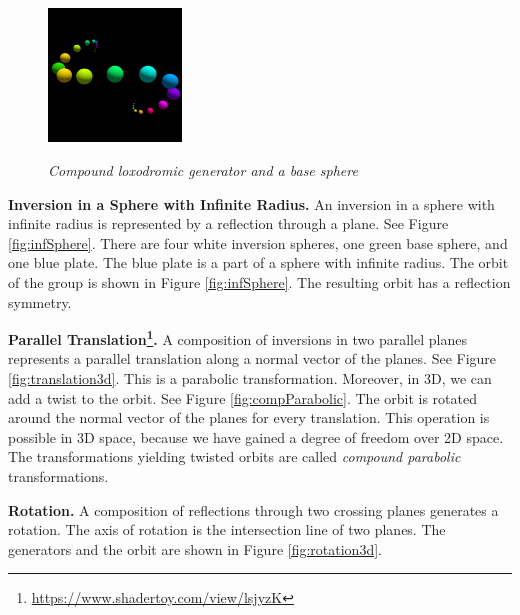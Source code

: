 \begin{figure}[h!tbp]
\begin{minipage}[t]{0.5\hsize}
 \hspace*{\fill}
  \begin{minipage}[t]{0.25\hsize}
   \center
   \includegraphics[width=1.4in, height=1.4in, keepaspectratio]{./img/application/3dGen/compLoxoOneOrb.pdf}
   \label{fig:compLoxoOrb}
  \end{minipage}
  \hspace*{\fill}
  \caption{\textit{Compound loxodromic generator and a base sphere}}
  \label{fig:compLoxo}
 \end{minipage}
\end{figure}

\noindent\textbf{Inversion in a Sphere with Infinite Radius.}
An inversion in a sphere with infinite radius is represented by
a reflection through a plane.
See Figure \ref{fig:infSphere}.
There are four white inversion spheres, one green base sphere,
and one blue plate.
The blue plate is a part of a sphere with infinite radius.
The orbit of the group is shown in Figure
\ref{fig:infSphere}.
The resulting orbit has a reflection symmetry.

\noindent\textbf{Parallel
Translation\footnote{\url{https://www.shadertoy.com/view/lsjyzK}}.}
A composition of inversions in two parallel planes represents a parallel
translation along a normal vector of the planes.
See Figure \ref{fig:translation3d}.
This is a parabolic transformation.
Moreover, in 3D, we can add a twist to the orbit.
See Figure \ref{fig:compParabolic}.
The orbit is rotated around the normal vector of the planes for every
translation.
This operation is possible in 3D space, because we have gained a degree
of freedom over 2D space.
The transformations yielding twisted orbits are called \textit{compound
parabolic} transformations.

\noindent\textbf{Rotation.}
A composition of reflections through two crossing planes generates a rotation.
The axis of rotation is the intersection line of two planes.
The generators and the orbit are shown in Figure \ref{fig:rotation3d}.

